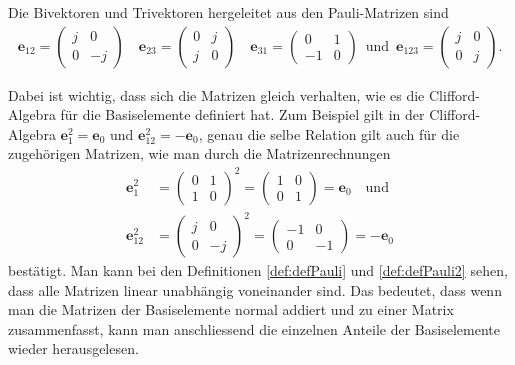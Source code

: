 \begin{definition} \label{def:defPauli2} 
	Die Bivektoren und Trivektoren hergeleitet aus den Pauli-Matrizen sind
	\begin{align} \label{Pauli2}
		\mathbf{e}_{12} =  
		\begin{pmatrix}
			j & 0 \\
			0 & -j
		\end{pmatrix}\quad
		\mathbf{e}_{23} =
		\begin{pmatrix}
			0 & j \\
			j & 0
		\end{pmatrix}\quad
		\mathbf{e}_{31} =
		\begin{pmatrix}
			0 & 1 \\
			-1 & 0
		\end{pmatrix}\enspace\text{und}\enspace
		\mathbf{e}_{123} =
		\begin{pmatrix}
			j & 0 \\
			0 & j
		\end{pmatrix}.
	\end{align}
\end{definition}
Dabei ist wichtig, dass sich die Matrizen gleich verhalten, wie es die Clifford-Algebra für die Basiselemente definiert hat. Zum Beispiel gilt in der Clifford-Algebra $\mathbf{e}_1^2=\mathbf{e}_0$ und $\mathbf{e}_{12}^2=-\mathbf{e}_0$, genau die selbe Relation gilt auch für die zugehörigen Matrizen, wie man durch die Matrizenrechnungen
\begin{align}
	\mathbf{e}_1^2 &=
	\begin{pmatrix}
		0 & 1 \\
		1 & 0
	\end{pmatrix}^2 = 
	\begin{pmatrix}
		1 & 0 \\
		0 & 1
	\end{pmatrix}= \mathbf{e}_0 \quad\text{und}\\
	\mathbf{e}_{12}^2 &=
	\begin{pmatrix}
		j & 0 \\
		0 & -j
	\end{pmatrix}^2 = 
	\begin{pmatrix}
		-1 & 0 \\
		0 & -1
	\end{pmatrix} = -\mathbf{e}_0 
\end{align}
bestätigt. Man kann bei den Definitionen \ref{def:defPauli} und \ref{def:defPauli2} sehen, dass alle Matrizen linear unabhängig voneinander sind. Das bedeutet, dass wenn man die Matrizen der Basiselemente normal addiert und zu einer Matrix zusammenfasst, kann man anschliessend die einzelnen Anteile der Basiselemente wieder herausgelesen.
